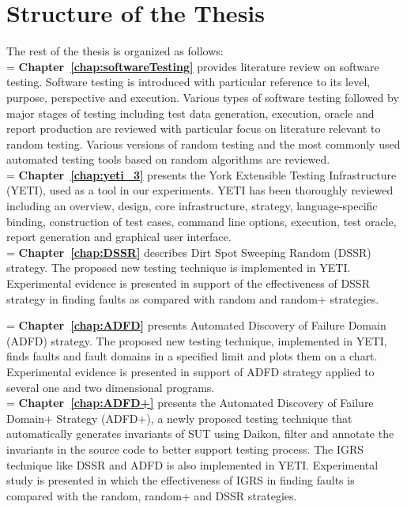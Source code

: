 \section{Structure of the Thesis}
The rest of the thesis is organized as follows:\\

\hangindent=\parindent
{}
\noindent
\textbf{Chapter~\ref{chap:softwareTesting}} provides literature review on software testing. Software testing is introduced with particular reference to its level, purpose, perspective and execution. Various types of software testing followed by major stages of testing including test data generation, execution, oracle and report production are reviewed with particular focus on literature relevant to random testing. Various versions of random testing and the most commonly used automated testing tools based on random algorithms are reviewed. \\


\hangindent=\parindent
{}
\noindent
\textbf{Chapter~\ref{chap:yeti_3}} presents the York Extensible Testing Infrastructure (YETI), used as a tool in our experiments. YETI has been thoroughly reviewed including an overview, design, core infrastructure, strategy, language-specific binding, construction of test cases, command line options, execution, test oracle, report generation and graphical user interface.\\

\hangindent=\parindent
{}
\noindent
\textbf{Chapter~\ref{chap:DSSR}} describes Dirt Spot Sweeping Random (DSSR) strategy. The proposed new testing technique is implemented in YETI. Experimental evidence is presented in support of the effectiveness of DSSR strategy in finding faults as compared with random and random+ strategies. 

\hangindent=\parindent
{}
\noindent
\textbf{Chapter~\ref{chap:ADFD}} presents Automated Discovery of Failure Domain (ADFD) strategy. The proposed new testing technique, implemented in YETI, finds faults and fault domains in a specified limit and plots them on a chart. Experimental evidence is presented in support of ADFD strategy applied to several one and two dimensional programs. \\

 
\hangindent=\parindent
{}
\noindent
\textbf{Chapter~\ref{chap:ADFD+}} presents the Automated Discovery of Failure Domain+ Strategy (ADFD+), a newly proposed testing technique that automatically generates invariants of SUT using Daikon, filter and annotate the invariants in the source code to better support testing process. The IGRS technique like DSSR and ADFD is also implemented in YETI. Experimental study is presented in which the effectiveness of IGRS in finding faults is compared with the random, random+ and DSSR strategies. 

